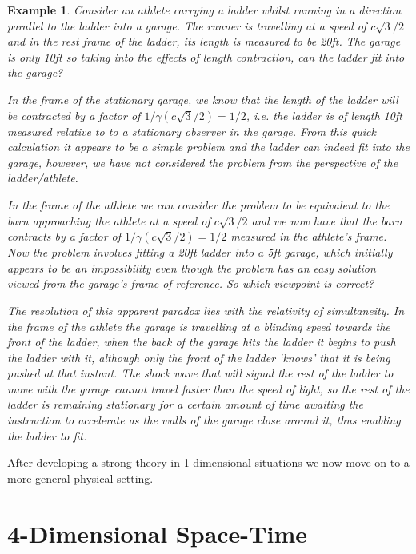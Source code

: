 \documentclass[a4paper,12pt,draft]{report}
\newtheorem{example}{Example}
\begin{document}
\begin{example}
Consider an athlete carrying a ladder whilst running in a direction parallel to the ladder into a garage. The runner is travelling at a speed of $c\sqrt{3}/2$ and in the rest frame of the ladder, its length is measured to be 20ft. The garage is only 10ft so taking into the effects of length contraction, can the ladder fit into the garage?

In the frame of the stationary garage, we know that the length of the ladder will be contracted by a factor of $1/\gamma(c\sqrt{3}/2) = 1/2$, i.e. the ladder is of length 10ft measured relative to to a stationary observer in the garage. From this quick calculation it appears to be a simple problem and the ladder can indeed fit into the garage, however, we have not considered the problem from the perspective of the ladder/athlete.

In the frame of the athlete we can consider the problem to be equivalent to the barn approaching the athlete at a speed of $c\sqrt{3}/2$ and we now have that the barn contracts by a factor of $1/\gamma(c\sqrt{3}/2) = 1/2$ measured in the athlete's frame. Now the problem involves fitting a 20ft ladder into a 5ft garage, which initially appears to be an impossibility even though the problem has an easy solution viewed from the garage's frame of reference. So which viewpoint is correct?

The resolution of this apparent paradox lies with the relativity of simultaneity. In the frame of the athlete the garage is travelling at a blinding speed towards the front of the ladder, when the back of the garage hits the ladder it begins to push the ladder with it, although only the front of the ladder `knows' that it is being pushed at that instant. The shock wave that will signal the rest of the ladder to move with the garage cannot travel faster than the speed of light, so the rest of the ladder is remaining stationary for a certain amount of time awaiting the instruction to accelerate as the walls of the garage close around it, thus enabling the ladder to fit.
\end{example}

After developing a strong theory in 1-dimensional situations we now move on to a more general physical setting.


\chapter{4-Dimensional Space-Time}
\end{document}
